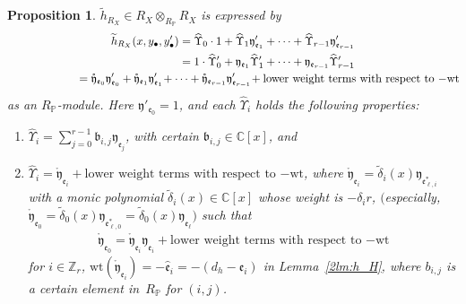 \documentclass[pdftex]{sigma}
\def\CC{{\mathbb C}}
\def\ZZ{{\mathbb Z}}
\def\PP{{\mathbb P}}
\def\fb{{\mathfrak b}}
\def\fe{{\mathfrak e}}
\def\fy{{\mathfrak y}}
\def\th{{\widetilde h}}
\def\tdelta{{\widetilde \delta}}
\def\hfe{{\widehat{\mathfrak e}}}
\def\hUpsilon{{\widehat \Upsilon}}
\def\rfy{{\mathring{\mathfrak y}}}
\def\wt{{\mathrm {wt}}}
\numberwithin{equation}{section}
\newtheorem{Proposition}[Theorem]{Proposition}
 { \theoremstyle{definition}
\newtheorem{Definition}[Theorem]{Definition}
\newtheorem{Note}[Theorem]{Note}
\newtheorem{Example}[Theorem]{Example}
\newtheorem{Remark}[Theorem]{Remark} }
\begin{document}
\begin{Proposition}\label{2pr:h_RXe_ys}$\th_{R_X}\in R_X\otimes_{R_\PP} R_X$ is expressed by
\begin{gather*}
\th_{R_X}(x, y_{\bullet}, y_{\bullet}')= \hUpsilon_{0}\cdot 1
+ \hUpsilon_{1}\fy'_{\fe_1}+\cdots+ \hUpsilon_{r-1}\fy'_{\fe_{r-1}}\\
\hphantom{\th_{R_X}(x, y_{\bullet}, y_{\bullet}')}{}
= 1\cdot\hUpsilon_{0}'
+ \fy_{\fe_1}\hUpsilon_{1}'+\cdots+ \fy_{\fe_{r-1}}\hUpsilon_{r-1}'\\
\hphantom{\th_{R_X}(x, y_{\bullet}, y_{\bullet}')}{}
= \rfy_{\fe_0}\fy'_{\fe_0}
+ \rfy_{\fe_1}\fy'_{\fe_1}\!+\cdots+ \rfy_{\fe_{r-1}}\fy'_{\fe_{r-1}} \!
 +\text{lower weight terms with respect to $-\wt$}\!
\end{gather*}
as an $R_\PP$-module.
Here $\fy'_{\fe_0}=1$, and each $\hUpsilon_{i}$ holds the following properties:
\begin{enumerate}\itemsep=0pt
\item[$(1)$]
$\hUpsilon_{i}=\sum_{j=0}^{r-1} \fb_{i,j} \fy_{\fe_j}$, with certain $\fb_{i,j}\in \CC[x]$, and

\item[$(2)$]
$\hUpsilon_{i}= \rfy_{\fe_i}+
\text{lower weight terms with respect to $-\wt$}$,
where
$\rfy_{\fe_i}
=\tdelta_i(x) \fy_{\fe_{\ell,i}^*}$
with a monic polynomial $\tdelta_i(x) \in \CC[x]$ whose weight is
$-\delta_i r$, $($especially, $\rfy_{\fe_0}
=\tdelta_0(x) \fy_{\fe_{\ell,0}^*}=\tdelta_0(x) \fy_{\fe_{\ell}})$
such that
\begin{gather*}
\rfy_{\fe_0}=\rfy_{\fe_i}\fy_{\fe_i}+
\text{lower weight terms with respect to $-\wt$}
\end{gather*} for
$i \in \ZZ_r$, $\wt(\rfy_{\fe_i})=-\hfe_i=-(d_h - \fe_i)$ in
Lemma~{\rm \ref{2lm:h_H}}, where $b_{i, j}$ is a certain element in~$R_\PP$ for $(i,j)$.
\end{enumerate}
\end{Proposition}
\end{document}
